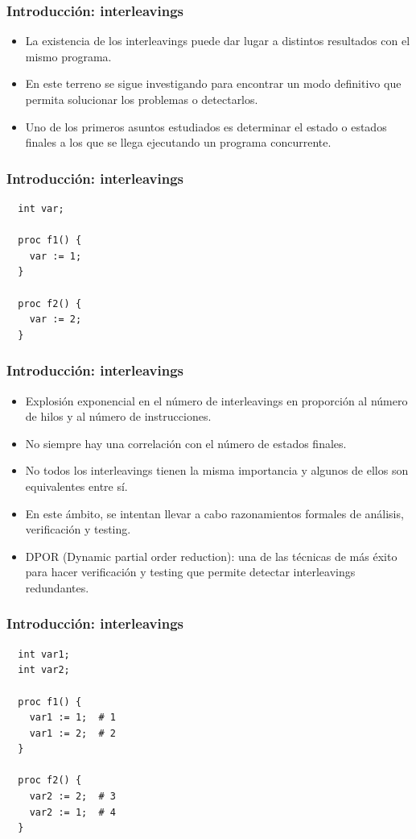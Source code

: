 \documentclass[spanish, a4paper, 12pt, final, slideColor, nototal, colorBG, pdf, noaccumulate, darkblue] {beamer}
\begin{document}
\begin{frame}
  \frametitle{Introducción: interleavings}
  \begin{itemize}
    \item La existencia de los interleavings puede dar lugar a distintos resultados con el mismo programa.
    \item En este terreno se sigue investigando para encontrar un modo definitivo que permita solucionar los problemas o detectarlos.
    \item Uno de los primeros asuntos estudiados es determinar el estado o estados finales a los que se llega ejecutando un programa concurrente.
  \end{itemize}
\end{frame}

\begin{frame}[fragile]
  \frametitle{Introducción: interleavings}
  \begin{lstlisting}
  int var;

  proc f1() {
    var := 1;
  }

  proc f2() {
    var := 2;
  }
  \end{lstlisting}
\end{frame}

\begin{frame}
  \frametitle{Introducción: interleavings}
  \begin{itemize}
  \item Explosión exponencial en el número de interleavings en proporción al número de hilos y al número de instrucciones.
  \item No siempre hay una correlación con el número de estados finales.
  \item No todos los interleavings tienen la misma importancia y algunos de ellos son equivalentes entre sí.
  \item En este ámbito, se intentan llevar a cabo razonamientos formales de análisis, verificación y testing.
  \item DPOR (Dynamic partial order reduction): una de las técnicas de más éxito para hacer verificación y testing que permite detectar interleavings redundantes.
  \end{itemize}
\end{frame}

\begin{frame}[fragile]
  \frametitle{Introducción: interleavings}
  \begin{lstlisting}
  int var1;
  int var2;

  proc f1() {
    var1 := 1;  # 1
    var1 := 2;  # 2
  }

  proc f2() {
    var2 := 2;  # 3
    var2 := 1;  # 4
  }
  \end{lstlisting}
\end{frame}
\end{document}
